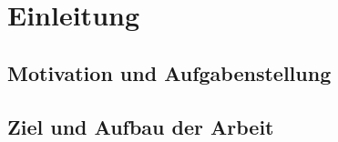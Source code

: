 \chapter{Einleitung}


\section{Motivation und Aufgabenstellung} %
\begin{comment}
Bei der Entwicklung mobiler Anwendungen steht - besonders im Consumer-Bereich - neben vielen anderen Entscheidungen die Wahl der Ziel-Plattform an, wobei ein wichtiger Faktor sicher die Erreichbarkeit einer möglichst großen Nutzer-Anzahl darstellt.
Vermutlich um den  Entwicklungsaufwand nicht ins Bodenlose \todo{Stil!} ausufern zu lassen beschränken sich dabei viele App-Hersteller (oder -anbieter) auf die größten, meist genutzten Plattformen wie Android oder iOS. \todo{darf man so eine Behauptung jetzt einfach machen? oder wie weißt man sowas nach?}

Doch nicht nur, dass dadurch doppelter Wartungs- und Anpassungsaufwand für die Entwicklung entsteht, auch werden dadurch viele andere Betriebssysteme vernachlässigt, was letztlich zu Lasten der Nutzer geht, die auf einem vielfältigen aber auch diffundierten Markt - je nach Hersteller und Plattform - ein zum Teil eingeschränktes und ungleich verteiltes Angebot an Anwendungen vorfinden. 

Auf der anderen Seite hat der Bereich der Webentwicklung und -gestaltung in den letzten Jahren seit Aufkommen von Smartphones und Tablets eine neue Anforderung hinzu bekommen: Websites müssen nicht mehr nur für die unterschiedlichsten Browser auf dem Desktop angepasst werden, sondern sollen sich auch auf Geräten, die für Touch-Bedienung ausgelegt sind unterschiedlicher Bildschirmgrößen gleich gut anfühlen und bedienen lassen. Da der Trend für viele Firmen in Sachen Öffentlichkeitsarbeit, Kundenbindung und -freundlichkeit neben der Firmen-Website und der eigenen Facebook-Seite auch eine eigene App zu fordern scheint, liegt vor dem zuvor genannten Hintergrund der stark variierenden App-Formate der Ansatz nahe, auch den Webbrowser als eine weitere Plattform im bunten Gefüge aus Deployment-Anforderungen zu sehen, die nach Verminderung und Zusammenführung des Entwicklungsaufwands im mobilen Bereich verlangt. 

Letzterer Ansatz ist allerdings nur einer, den es zu Untersuchen gilt; Zentraler Forschungsgegenstand soll die Exploration der Möglichkeiten und Grenzen der plattformunabhängigen App-Entwicklung anhand eines beispielhaft implementierten Anwendungsfalls sein.
\end{comment}

\section{Ziel und Aufbau der Arbeit} %
